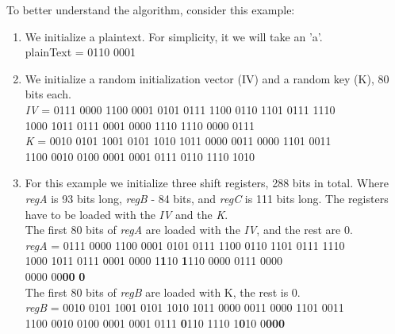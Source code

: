 To better understand the algorithm, consider this example:
\begin{enumerate}
	\setlength\itemsep{0.1em}
	\item We initialize a plaintext. For simplicity, it we will take an 'a'.\\
	{\selectfont
		plainText = 0110 0001
	}
	\item We initialize a random initialization vector (IV) and a random key (K), 80 bits each.\\
	{\selectfont
		\emph{IV} = 0111 0000 1100 0001 0101 0111 1100 0110 1101 0111 1110\\ 
		\indent\hspace{1.2cm}1000 1011 0111 0001 0000 1110 1110 0000 0111
	}
	\vspace{0.5em}
	\\
	{\selectfont
		\emph{K} = 0010 0101 1001 0101 1010 1011 0000 0011 0000 1101 0011\\
		\indent\hspace{1cm}1100 0010 0100 0001 0001 0111 0110 1110 1010
	}
	\item For this example we initialize three shift registers, 288 bits in total. Where \emph{regA} is 93 bits long, \emph{regB} - 84 bits, and \emph{regC} is 111 bits long. The registers have to be loaded with the \emph{IV} and the \emph{K}. \\
	The first 80 bits of \emph{regA} are loaded with the \emph{IV}, and the rest are 0. 
	\vspace{0.5em}
	\\
	{\selectfont
		\emph{regA} = 0111 0000 1100 0001 0101 0111 1100 0110 1101 0111 1110 \\ 
		\indent\hspace{1.6cm}1000 1011 0111 0001 0000 1\textbf{1}10 \textbf{1}110 0000 0111 0000 \\
		\indent\hspace{1.6cm}0000 00\textbf{00} \textbf{0}
	}
	\vspace{0.5em}
	\\
	The first 80 bits of \emph{regB} are loaded with K, the rest is 0. \\
	{\selectfont
		\emph{regB} = 0010 0101 1001 0101 1010 1011 0000 0011 0000 1101 0011 \\ 
		\indent\hspace{1.6cm}1100 0010 0100 0001 0001 0111 \textbf{0}110 1110 1\textbf{0}10 0\textbf{000}
	}
	\vspace{0.5em}

\end{enumerate}
